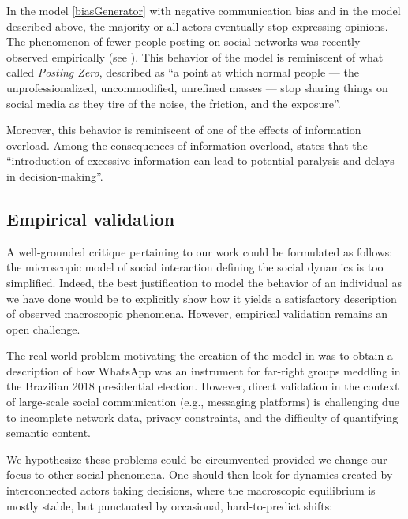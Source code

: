 \documentclass[11pt]{article}
\theoremstyle{definition}
\begin{document}
In the model \eqref{biasGenerator} with negative communication bias and in the model described above, the majority or all actors eventually stop expressing opinions. The phenomenon of fewer people posting on social networks was recently observed empirically (see \cite{lesspostingonsocialnetworks}). This behavior of the model is reminiscent of what \cite{Chayka} called \textit{Posting Zero}, described as ``a point at which normal people --- the unprofessionalized, uncommodified, unrefined masses --- stop sharing things on social media as they tire of the noise, the friction, and the exposure''. 

Moreover, this behavior is reminiscent of one of the effects of information overload. Among the consequences of information overload, \cite{informationoverload} states that the ``introduction of excessive information can lead to potential paralysis and delays in decision-making''.


\subsection{Empirical validation}

A well-grounded critique pertaining to our work could be formulated as follows: the microscopic model of social interaction defining the social dynamics is too simplified. Indeed, the best justification to model the behavior of an individual as we have done would be to explicitly show how it yields a satisfactory description of observed macroscopic phenomena. However, empirical validation remains an open challenge. 

The real-world problem motivating the creation of the model in \cite{galves2024fastconsensusmetastabilityhighly} was to obtain a description of how WhatsApp was an instrument for far-right groups meddling in the Brazilian 2018 presidential election. However, direct validation in the context of large-scale social communication (e.g., messaging platforms) is challenging due to incomplete network data, privacy constraints, and the difficulty of quantifying semantic content.

We hypothesize these problems could be circumvented provided we change our focus to other social phenomena. One should then look for dynamics created by interconnected actors taking decisions, where the macroscopic equilibrium is mostly stable, but punctuated by occasional, hard-to-predict shifts:
\end{document}

